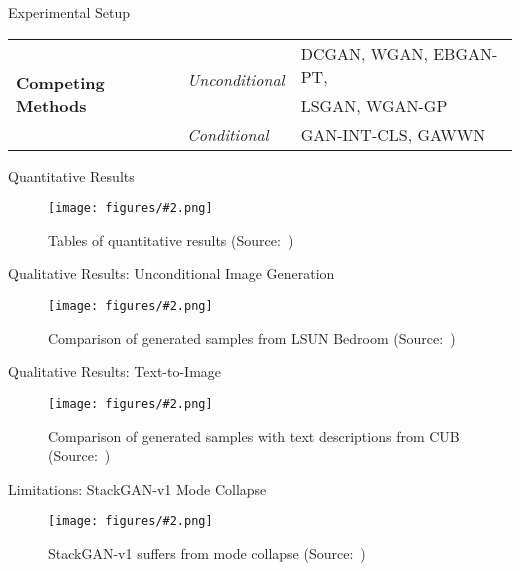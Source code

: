 \documentclass{beamer}
\newcommand{\paperfigure}[3][width=\textwidth]{%
    \begin{figure}%
        \centering%
        \texttt{[image: figures/\#2.png]}%
        \caption{#3 (Source:~\cite{stackgan++})}%
    \end{figure}%
}
\begin{document}
\begin{frame}{Experimental Setup}
    \centering
    \begin{tabular}{|p{}|p{}|p{}|}
        \hline
        \multirow{4}{0.15\textwidth}{\textbf{Competing Methods}} & \multirow{2}{0.2\textwidth}{\textit{Unconditional}} & DCGAN, WGAN, EBGAN-PT, \\
                                                                 &                                                     & LSGAN, WGAN-GP \\\cline{2-3}
                                                                 & \multirow{2}{0.2\textwidth}{\textit{Conditional}}   & \multirow{2}{0.45\textwidth}{GAN-INT-CLS, GAWWN} \\
                                                                 &                                                     & \\
        \hline
    \end{tabular}
\end{frame}


\begin{frame}{Quantitative Results}
    \paperfigure[width=\textwidth]{quantitative_results}{Tables of quantitative results}
\end{frame}

\begin{frame}{Qualitative Results: Unconditional Image Generation}
    \paperfigure[width=\textwidth]{qualitative_results_unconditional}{Comparison of generated samples from LSUN Bedroom}
\end{frame}

\begin{frame}{Qualitative Results: Text-to-Image}
    \paperfigure[width=0.9\textwidth]{qualitative_results_conditional}{Comparison of generated samples with text descriptions from CUB}
\end{frame}

\begin{frame}{Limitations: StackGAN-v1 Mode Collapse}
    \paperfigure[width=\textwidth]{mode_collapse}{StackGAN-v1 suffers from mode collapse}
\end{frame}
\end{document}
